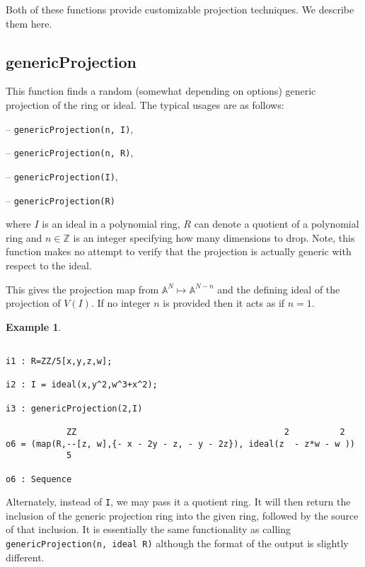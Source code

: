 \documentclass[11pt]{amsart}
\theoremstyle{definition}
\newtheorem{example}{Example}[section]
\begin{document}
Both of these functions provide customizable projection techniques. We describe them here. 


\subsection{genericProjection} 
This function finds a random (somewhat depending on options) generic projection of the ring or ideal.
The typical usages are as follows: 
\vspace{1em}

-- {\tt genericProjection(n, I)},

-- {\tt genericProjection(n, R)},


-- {\tt genericProjection(I)},  

-- {\tt genericProjection(R)} 

\vspace{1em}
\noindent where 
$I$ is an ideal 
in a polynomial ring, 
$R$ can denote a quotient of a polynomial ring and 
$n\in \mathbb{Z}$ is
an integer specifying how many dimensions to drop.  Note, this function makes no attempt to verify that the projection is actually generic with respect to the ideal.


This gives the projection map from $\mathbb{A}^N \mapsto\mathbb{A}^{N-n}$ and the defining ideal of the projection of $V(I)$. If no integer $n$ is provided then it acts as if $n = 1$. 

\begin{example}	
	{{\small\color{blue}
	\begin{verbatim}

i1 : R=ZZ/5[x,y,z,w];

i2 : I = ideal(x,y^2,w^3+x^2);

i3 : genericProjection(2,I)

            ZZ                                         2          2
o6 = (map(R,--[z, w],{- x - 2y - z, - y - 2z}), ideal(z  - z*w - w ))                   
            5

o6 : Sequence
	\end{verbatim}
	}}
\end{example}

Alternately, instead of {\tt I}, we may pass it a quotient ring.  It will then return the inclusion of the generic projection ring into the given ring, followed by the source of that inclusion.  It is essentially the same functionality as calling {\tt genericProjection(n, ideal R)} although the format of the output is slightly different. 
\end{document}
